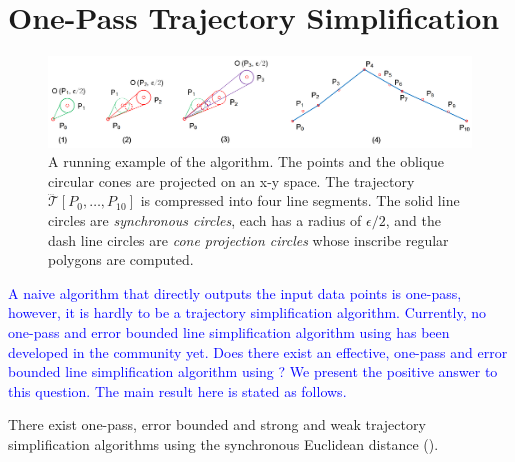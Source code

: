 \section{One-Pass Trajectory Simplification}
\label{sec-alg}


\begin{figure}[tb!]
	\centering
	\includegraphics[scale=0.8]{figures/Fig-Ex-Conest.png}
	\caption{\small A running example of the \cist algorithm. The points and the oblique circular cones are projected on an x-y space. The trajectory $\dddot{\mathcal{T}}[P_0, \ldots, P_{10}]$ is compressed into four line segments. The solid line circles are \emph{synchronous circles}, each has a radius of $\epsilon/2$, and the dash line circles are \emph{cone projection circles} whose inscribe regular polygons are computed.}
	\label{fig:exm-const}
\end{figure}

\textcolor{blue}{A naive algorithm that directly outputs the input data points is one-pass, however, it is hardly to be a trajectory simplification algorithm. Currently, no one-pass and error bounded line simplification algorithm using \sed has been developed in the community yet.
Does there exist an effective, one-pass and error bounded line simplification algorithm using \sed?
We present the positive answer to this question. The main result here is stated as follows.}

\begin{theorem}
\label{prop-cist-op}
There exist one-pass, error bounded and strong and weak trajectory simplification algorithms using the synchronous Euclidean distance (\sed).
\end{theorem}

